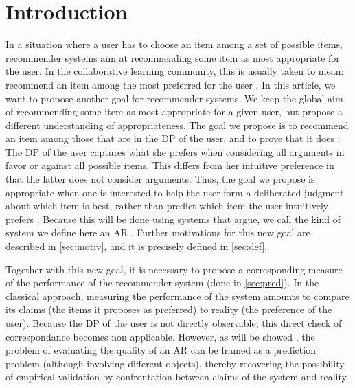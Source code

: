 \documentclass[version=3.21, pagesize, twoside=off, bibliography=totoc, DIV=calc, fontsize=12pt, a4paper, french, english]{scrartcl}
\begin{document}
\section{Introduction}
\label{sec:intro}
In a situation where a user has to choose an item among a set of possible items, recommender systems aim at recommending some item as most appropriate for the user.
In the collaborative learning community, this is usually taken to mean: recommend an item among the most preferred for the user . In this article, we want to propose another goal for recommender systems. We keep the global aim of recommending some item as most appropriate for a given user, but propose a different understanding of appropriateness. The goal we propose is to recommend an item among those that are in the \ac{DP} of the user, and to prove that it does . The \ac{DP} of the user captures what she prefers when considering all arguments in favor or against all possible items. This differs from her intuitive preference  in that the latter does not consider arguments. Thus, the goal we propose is appropriate when one is interested to help the user form a deliberated judgment about which item is best, rather than predict  which item the user intuitively prefers . Because this will be done using systems that argue, we call the kind of system we define here an \ac{AR} .
Further motivations for this new goal are described in \cref{sec:motiv}, and it is precisely defined in \cref{sec:def}.

Together with this new goal, it is necessary to propose a corresponding measure of the performance of the recommender system (done in \cref{sec:pred}). In the classical approach, measuring the performance of the system amounts to compare its claims (the items it proposes as preferred) to reality (the preference of the user). Because the \ac{DP} of the user is not directly observable, this direct check of correspondance becomes non applicable. However, as will be showed , the problem of evaluating the quality of an \ac{AR} can be framed as a prediction problem (although involving different objects), thereby recovering the possibility of empirical validation by confrontation between claims of the system and reality.
\end{document}
